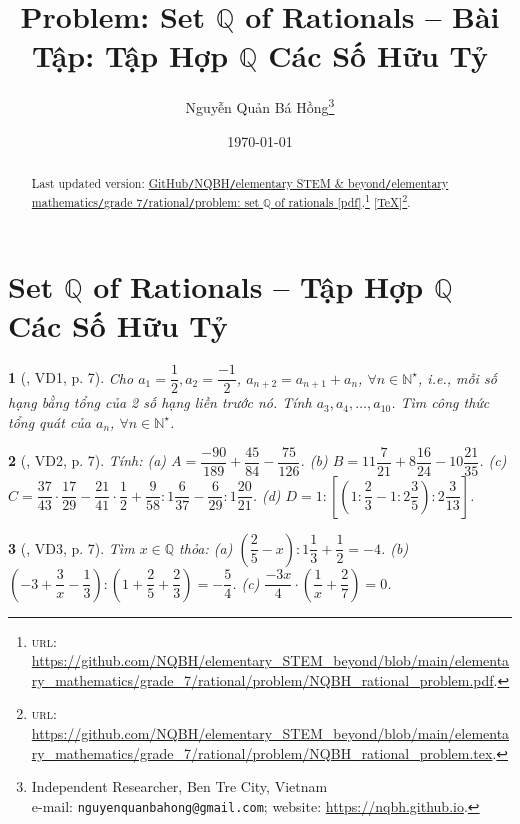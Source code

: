\documentclass{article}
\title{Problem: Set $\mathbb{Q}$ of Rationals -- Bài Tập: Tập Hợp $\mathbb{Q}$ Các Số Hữu Tỷ}
\author{Nguyễn Quản Bá Hồng\footnote{Independent Researcher, Ben Tre City, Vietnam\\e-mail: \texttt{nguyenquanbahong@gmail.com}; website: \url{https://nqbh.github.io}.}}
\date{\today}
\newtheorem{baitoan}{}
\begin{document}
\maketitle
\begin{abstract}
	Last updated version: \href{https://github.com/NQBH/elementary_STEM_beyond/blob/main/elementary_mathematics/grade_7/rational/problem/NQBH_rational_problem.pdf}{GitHub{\tt/}NQBH{\tt/}elementary STEM \& beyond{\tt/}elementary mathematics{\tt/}grade 7{\tt/}rational{\tt/}problem: set $\mathbb{Q}$ of rationals [pdf]}.\footnote{\textsc{url}: \url{https://github.com/NQBH/elementary_STEM_beyond/blob/main/elementary_mathematics/grade_7/rational/problem/NQBH_rational_problem.pdf}.} [\href{https://github.com/NQBH/elementary_STEM_beyond/blob/main/elementary_mathematics/grade_7/rational/problem/NQBH_rational_problem.tex}{\TeX}]\footnote{\textsc{url}: \url{https://github.com/NQBH/elementary_STEM_beyond/blob/main/elementary_mathematics/grade_7/rational/problem/NQBH_rational_problem.tex}.}. 
\end{abstract}
\tableofcontents


\section{Set $\mathbb{Q}$ of Rationals -- Tập Hợp $\mathbb{Q}$ Các Số Hữu Tỷ}

\begin{baitoan}[\cite{Binh_boi_duong_Toan_7_tap_1}, VD1, p. 7]
	Cho $a_1 = \dfrac{1}{2},a_2 = \dfrac{-1}{2}$, $a_{n+2} = a_{n+1} + a_n$, $\forall n\in\mathbb{N}^\star$, i.e., mỗi số hạng bằng tổng của 2 số hạng liền trước nó. Tính $a_3,a_4,\ldots,a_{10}$. Tìm công thức tổng quát của $a_n$, $\forall n\in\mathbb{N}^\star$.
\end{baitoan}

\begin{baitoan}[\cite{Binh_boi_duong_Toan_7_tap_1}, VD2, p. 7]
	Tính: (a) $A = \dfrac{-90}{189} + \dfrac{45}{84} - \dfrac{75}{126}$. (b) $B = 11\dfrac{7}{21} + 8\dfrac{16}{24} - 10\dfrac{21}{35}$. (c) $C = \dfrac{37}{43}\cdot\dfrac{17}{29} - \dfrac{21}{41}\cdot\dfrac{1}{2} + \dfrac{9}{58}:1\dfrac{6}{37} - \dfrac{6}{29}:1\dfrac{20}{21}$. (d) $D = 1:\left[\left(1:\dfrac{2}{3} - 1:2\dfrac{3}{5}\right):2\dfrac{3}{13}\right]$.
\end{baitoan}

\begin{baitoan}[\cite{Binh_boi_duong_Toan_7_tap_1}, VD3, p. 7]
	Tìm $x\in\mathbb{Q}$ thỏa: (a) $\left(\dfrac{2}{5} - x\right):1\dfrac{1}{3} + \dfrac{1}{2} = -4$. (b) $\left(-3 + \dfrac{3}{x} - \dfrac{1}{3}\right):\left(1 + \dfrac{2}{5} + \dfrac{2}{3}\right) = -\dfrac{5}{4}$. (c) $\dfrac{-3x}{4}\cdot\left(\dfrac{1}{x} + \dfrac{2}{7}\right) = 0$.
\end{baitoan}
\end{document}
